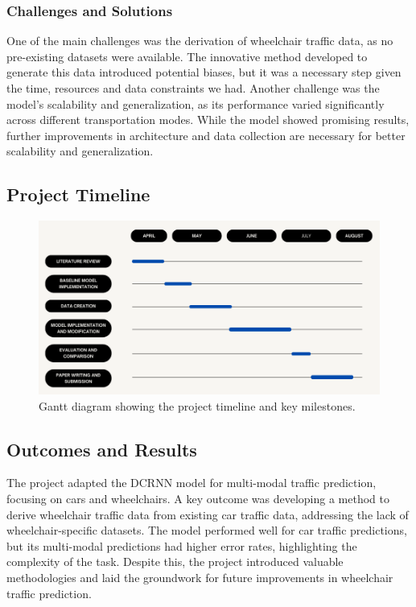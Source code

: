\subsubsection{Challenges and Solutions}\label{subsubsec:challenges-and-solutions}
One of the main challenges was the derivation of wheelchair traffic data, as no pre-existing datasets were available.
The innovative method developed to generate this data introduced potential biases, but it was a necessary step given the
time, resources and data constraints we had.
Another challenge was the model's scalability and generalization, as its performance varied significantly across
different transportation modes.
While the model showed promising results, further improvements in architecture and data collection are necessary for better
scalability and generalization.

\subsection{Project Timeline}\label{subsec:project-timeline}
\begin{figure}[htbp]
    \centering
    \includegraphics[width=1\textwidth]{images/gantt}
    \caption{
        Gantt diagram showing the project timeline and key milestones.
    }
    \label{fig:model}
\end{figure}

\subsection{Outcomes and Results}\label{subsec:outcomes-and-results}
The project adapted the DCRNN model for multi-modal traffic prediction, focusing on cars and wheelchairs.
A key outcome was developing a method to derive wheelchair traffic data from existing car traffic data, addressing the
lack of wheelchair-specific datasets.
The model performed well for car traffic predictions, but its multi-modal predictions had higher error rates,
highlighting the complexity of the task.
Despite this, the project introduced valuable methodologies and laid the groundwork for future improvements in
wheelchair traffic prediction.